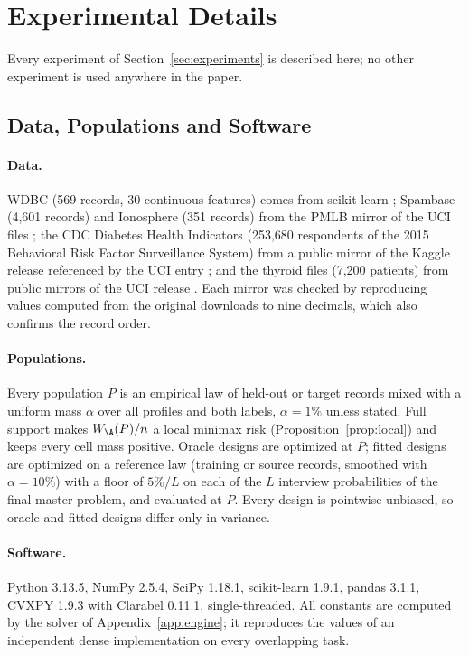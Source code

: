 \section{Experimental Details}\label{app:F}
Every experiment of Section~\ref{sec:experiments} is described here; no other experiment is used anywhere in the paper.

\subsection{Data, Populations and Software}\label{app:capsens}
\paragraph{Data.}
WDBC (569 records, 30 continuous features) comes from scikit-learn \citep{wolberg1993}; Spambase (4,601 records) and Ionosphere (351 records) from the PMLB mirror of the UCI files \citep{spambase1999,ionosphere1989,romano2021pmlb}; the CDC Diabetes Health Indicators (253,680 respondents of the 2015 Behavioral Risk Factor Surveillance System) from a public mirror of the Kaggle release referenced by the UCI entry \citep{cdcdiabetes2017}; and the thyroid files (7,200 patients) from public mirrors of the UCI release \citep{quinlan1986thyroid}. Each mirror was checked by reproducing values computed from the original downloads to nine decimals, which also confirms the record order.

\paragraph{Populations.}
Every population $P$ is an empirical law of held-out or target records mixed with a uniform mass $\alpha$ over all profiles and both labels, $\alpha=1\%$ unless stated. Full support makes $W_\A(P)/n$ a local minimax risk (Proposition~\ref{prop:local}) and keeps every cell mass positive. Oracle designs are optimized at $P$; fitted designs are optimized on a reference law (training or source records, smoothed with $\alpha=10\%$) with a floor of $5\%/L$ on each of the $L$ interview probabilities of the final master problem, and evaluated at $P$. Every design is pointwise unbiased, so oracle and fitted designs differ only in variance.

\paragraph{Software.}
Python 3.13.5, NumPy 2.5.4, SciPy 1.18.1, scikit-learn 1.9.1, pandas 3.1.1, CVXPY 1.9.3 with Clarabel 0.11.1, single-threaded. All constants are computed by the solver of Appendix~\ref{app:engine}; it reproduces the values of an independent dense implementation on every overlapping task.

